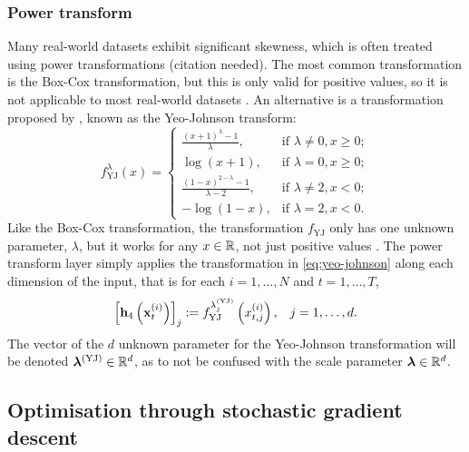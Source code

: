 \documentclass{statsmsc}
\begin{document}
{%

\subsubsection{Power transform}%
\label{ssub:Power transform}

Many real-world datasets exhibit significant skewness, which is often treated using power
transformations (citation needed). The most common transformation is the Box-Cox transformation,
but this is only valid for positive values, so it is not applicable to most real-world datasets
\citep{boxcox}. An alternative is a transformation proposed by \citeauthor{yeoJohnson},
known as the Yeo-Johnson transform:
\begin{equation}\label{eq:yeo-johnson}
    f_{\textrm{YJ}}^\lambda(x)= \left\{
        \begin{array}{ll}
            \frac{(x+1)^{\lambda}-1}{\lambda}, & \textrm{if } \lambda \neq 0, x \geq 0; \\
            \log(x + 1), & \textrm{if } \lambda = 0, x \geq 0;  \\
            \frac{(1-x)^{2-\lambda}-1}{\lambda-2} , & \textrm{if } \lambda \neq 2, x < 0; \\
            -\log(1-x), & \textrm{if } \lambda=2, x < 0.
        \end{array}
    \right.
\end{equation}
Like the Box-Cox transformation, the transformation $f_{\textrm{YJ}}$ only has one unknown parameter, $\lambda$, but
it works for any $x \in \mathbb{R}$, not just positive values \citep{yeoJohnson}.
The power transform layer simply applies the transformation in \cref{eq:yeo-johnson} along each dimension of the input, that is for each $i=1,\dots,N$ and $t=1,\dots,T$,
\begin{equation}
    \left[\mathbf{h}_4\left(\mathbf{x}_t^{(i)}\right)\right]_j:=f^{\lambda_j^{(\textrm{YJ})}}_{\textrm{YJ}}\left(x_{t,j}^{(i)}\right), \;\;\; j=1,\dots,d.
\end{equation}
The vector of the $d$ unknown parameter for the Yeo-Johnson transformation will be
denoted $\bm\lambda^{(\textrm{YJ})} \in \mathbb{R}^d$, as to not be confused with the scale parameter
$\bm\lambda \in \mathbb{R}^d$.



\subsection{Optimisation through stochastic gradient descent}%
\label{sub:Optimising the parameters}

}
\end{document}

